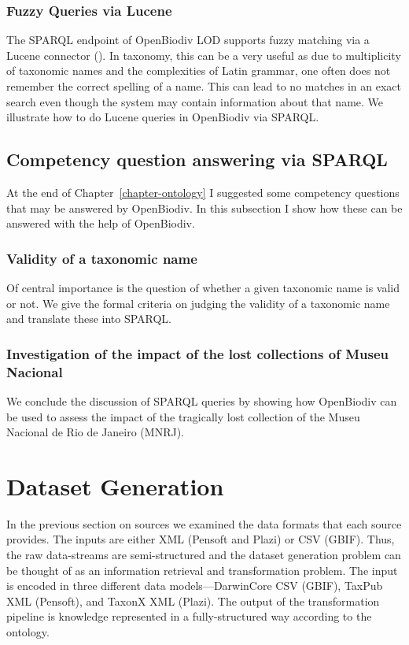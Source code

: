 \subsubsection{Fuzzy Queries via Lucene}

The SPARQL endpoint of OpenBiodiv LOD supports fuzzy matching via a Lucene connector (\cite{ontotext_graphdb_2018}). In taxonomy, this can be a very useful as due to multiplicity of taxonomic names and the complexities of Latin grammar, one often does not remember the correct spelling of a name. This can lead to no matches in an exact search even though the system may contain information about that name. We illustrate how to do Lucene queries in OpenBiodiv via SPARQL.

\subsection{Competency question answering via SPARQL}

At the end of Chapter~\ref{chapter-ontology} I suggested some competency questions that may be answered by OpenBiodiv. In this subsection I show how these can be answered with the help of OpenBiodiv.

\subsubsection{Validity of a taxonomic name}

Of central importance is the question of whether a given taxonomic name is valid or not. We give the formal criteria on judging the validity of a taxonomic name and translate these into SPARQL.

\subsubsection{Investigation of the impact of the lost collections of Museu Nacional}

We conclude the discussion of SPARQL queries by showing how OpenBiodiv can be used to assess the impact of the tragically lost collection of the Museu Nacional de Rio de Janeiro (MNRJ).

\section{Dataset Generation}

In the previous section on sources we examined the data formats that each source provides. The inputs are either XML (Pensoft and Plazi) or CSV (GBIF). Thus, the raw data-streams are semi-structured and the dataset generation problem can be thought of as an information retrieval and transformation problem. The input is encoded in three different data models---DarwinCore CSV (GBIF), TaxPub XML (Pensoft), and TaxonX XML (Plazi). The output of the transformation pipeline is  knowledge represented in a fully-structured way according to the ontology.

